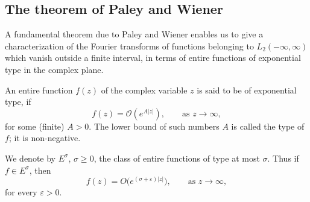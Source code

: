 \subsection*{The theorem of Paley and Wiener}
\noindent A fundamental theorem due to Paley and Wiener enables us to give a characterization of the Fourier transforms of functions belonging to $L_{2}(-\infty,\infty)$ which vanish outside a finite interval, in terms of entire functions of exponential type in the complex plane.

An entire function $f(z)$ of the complex variable $z$ is said to be of exponential type, if
\begin{equation}\tag{7.1}\label{eq:II-7.1}
f(z)=\mathcal O(e^{A|z|}),\qquad\text{as }z\to\infty,
\end{equation}
for some (finite) $A>0$. The lower bound of such numbers $A$ is called the type of $f$; it is non-negative.

We denote by $E^{\sigma}$, $\sigma\ge 0$, the class of entire functions of type at most $\sigma$. Thus if $f\in E^{\sigma}$, then
\begin{equation}\tag{7.2}\label{eq:II-7.2}
f(z)=O\bigl(e^{(\sigma+\varepsilon)|z|}\bigr),\qquad\text{as }z\to\infty,
\end{equation}
for every $\varepsilon>0$.

